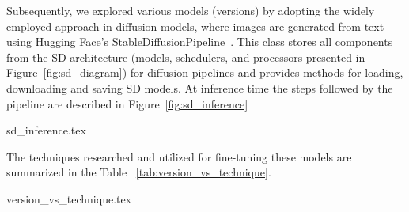 Subsequently, we explored various models (versions) by adopting the widely employed approach in diffusion models, where images are generated from text using Hugging Face's StableDiffusionPipeline~\cite{huggingfaceTexttoImageGeneration}. This class stores all components from the SD architecture (models, schedulers, and processors presented in Figure~\ref{fig:sd_diagram}) for diffusion pipelines and provides methods for loading, downloading and saving SD models. At inference time the steps followed by the pipeline are described in Figure~\ref{fig:sd_inference}

{sd_inference.tex}

The techniques researched and utilized for fine-tuning these models are summarized in the Table ~\ref{tab:version_vs_technique}.

{version_vs_technique.tex}

